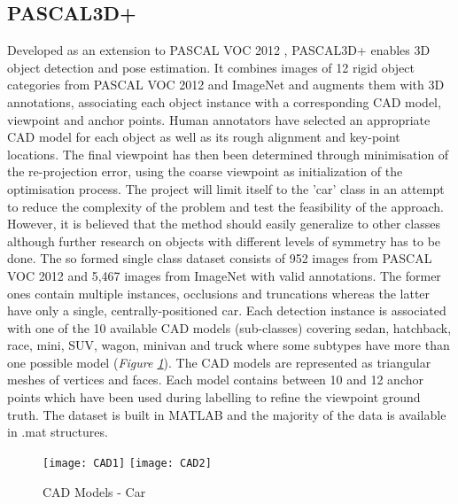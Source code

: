 \documentclass[main.tex]{subfiles}
\begin{document}
\subsection{PASCAL3D+}
Developed as an extension to PASCAL VOC 2012 \cite{Everingham2014}, PASCAL3D+ enables 3D object detection and pose estimation. It combines images of 12 rigid object categories from PASCAL VOC 2012 and ImageNet \cite{Deng2009} and augments them with 3D annotations, associating each object instance with a corresponding CAD model, viewpoint and anchor points. Human annotators have selected an appropriate CAD model for each object as well as its rough alignment and key-point locations. The final viewpoint has then been determined through minimisation of the re-projection error, using the coarse viewpoint as initialization of the optimisation process. The project will limit itself to the 'car' class in an attempt to reduce the complexity of the problem and test the feasibility of the approach. However, it is believed that the method should easily generalize to other classes although further research on objects with different levels of symmetry has to be done. The so formed single class dataset consists of 952 images from PASCAL VOC 2012 and 5,467 images from ImageNet with valid annotations. The former ones contain multiple instances, occlusions and truncations whereas the latter have only a single, centrally-positioned car. Each detection instance is associated with one of the 10 available CAD models (sub-classes) covering sedan, hatchback, race, mini, SUV, wagon, minivan and truck where some subtypes have more than one possible model (\emph{Figure \ref{fig:cadmodels}}). The CAD models are represented as triangular meshes of vertices and faces. Each model contains between 10 and 12 anchor points which have been used during labelling to refine the viewpoint ground truth. The dataset is built in MATLAB and the majority of the data is available in .mat structures.
\begin{figure}[h]
    \centering
    \texttt{[image: CAD1]}
    \texttt{[image: CAD2]}
    \caption{CAD Models - Car \cite{Xiang2014}}
    \label{fig:cadmodels}
\end{figure}
\end{document}
